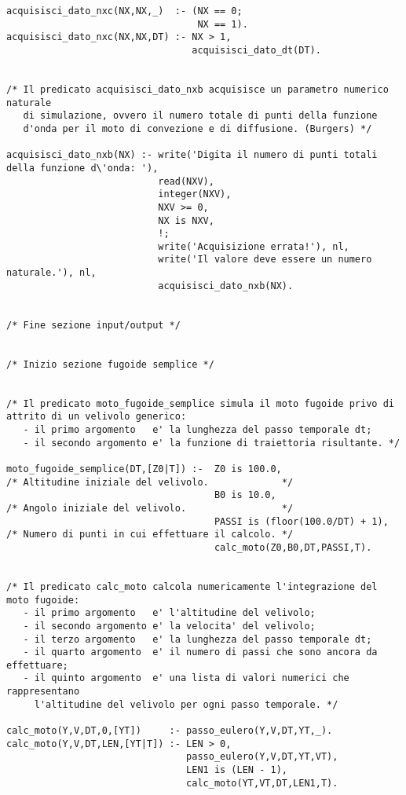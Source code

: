 \begin{verbatim}
acquisisci_dato_nxc(NX,NX,_)  :- (NX == 0;
                                  NX == 1).
acquisisci_dato_nxc(NX,NX,DT) :- NX > 1,
                                 acquisisci_dato_dt(DT).


/* Il predicato acquisisci_dato_nxb acquisisce un parametro numerico naturale 
   di simulazione, ovvero il numero totale di punti della funzione
   d'onda per il moto di convezione e di diffusione. (Burgers) */

acquisisci_dato_nxb(NX) :- write('Digita il numero di punti totali della funzione d\'onda: '),
                           read(NXV),
                           integer(NXV),
                           NXV >= 0,
                           NX is NXV,
                           !;     
                           write('Acquisizione errata!'), nl,
                           write('Il valore deve essere un numero naturale.'), nl,
                           acquisisci_dato_nxb(NX).

      
/* Fine sezione input/output */


/* Inizio sezione fugoide semplice */


/* Il predicato moto_fugoide_semplice simula il moto fugoide privo di attrito di un velivolo generico:
   - il primo argomento   e' la lunghezza del passo temporale dt;
   - il secondo argomento e' la funzione di traiettoria risultante. */

moto_fugoide_semplice(DT,[Z0|T]) :-  Z0 is 100.0,                    /* Altitudine iniziale del velivolo.             */
                                     B0 is 10.0,                     /* Angolo iniziale del velivolo.                 */
                                     PASSI is (floor(100.0/DT) + 1), /* Numero di punti in cui effettuare il calcolo. */
                                     calc_moto(Z0,B0,DT,PASSI,T).


/* Il predicato calc_moto calcola numericamente l'integrazione del moto fugoide:
   - il primo argomento   e' l'altitudine del velivolo;
   - il secondo argomento e' la velocita' del velivolo;
   - il terzo argomento   e' la lunghezza del passo temporale dt;
   - il quarto argomento  e' il numero di passi che sono ancora da effettuare;
   - il quinto argomento  e' una lista di valori numerici che rappresentano 
     l'altitudine del velivolo per ogni passo temporale. */

calc_moto(Y,V,DT,0,[YT])     :- passo_eulero(Y,V,DT,YT,_).  
calc_moto(Y,V,DT,LEN,[YT|T]) :- LEN > 0,
                                passo_eulero(Y,V,DT,YT,VT),
                                LEN1 is (LEN - 1),
                                calc_moto(YT,VT,DT,LEN1,T).



\end{verbatim}
